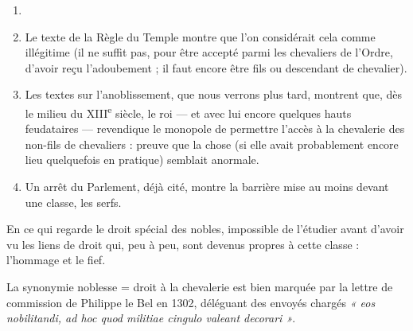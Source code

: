 \documentclass[french,twoside]{book} %
\begin{document}
\begin{enumerate}[itemsep=0pt,]
\item[] \hspace{-1.5em}{\bfseries Mais :}
\item  {}
\label{p65} Le texte de la Règle du Temple montre que l’on considérait cela comme illégitime (il ne suffit pas, pour être accepté parmi les chevaliers de l’Ordre, d’avoir reçu l’adoubement ; il faut encore être fils ou descendant de chevalier).
\item Les textes sur l’anoblissement, que nous verrons plus tard, montrent que, dès le milieu du XIII\textsuperscript{e} siècle, le roi — et avec lui encore quelques hauts feudataires — revendique le monopole de permettre l’accès à la chevalerie des non-fils de chevaliers : preuve que la chose (si elle avait probablement encore lieu quelquefois en pratique) semblait anormale.
\item Un arrêt du Parlement, déjà cité, montre la barrière mise au moins devant une classe, les serfs.

\end{enumerate}\noindent En ce qui regarde le droit spécial des nobles, impossible de l’étudier avant d’avoir vu les liens de droit qui, peu à peu, sont devenus propres à cette classe : l’hommage et le fief.\par
La synonymie noblesse = droit à la chevalerie est bien marquée par la lettre de commission de Philippe le Bel en 1302, déléguant des envoyés chargés \emph{« eos nobilitandi, ad hoc quod militiae cingulo valeant decorari »}.
\end{document}
